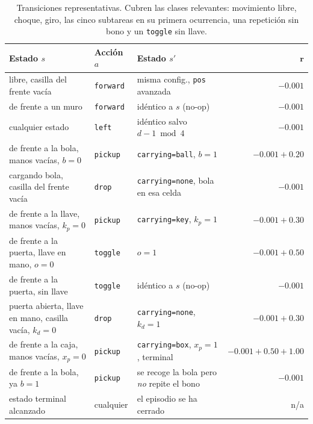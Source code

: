 \documentclass[11pt,a4paper]{article}
\begin{document}
\begin{table}[h]
  \centering
  \footnotesize
  \setlength{\extrarowheight}{3pt}
  \begin{tabularx}{\linewidth}{X l X r}
    \toprule
    \textbf{Estado \(s\)} & \textbf{Acción \(a\)} & \textbf{Estado \(s'\)} & \(\boldsymbol{r}\) \\
    \midrule
    libre, casilla del frente vacía & \texttt{forward} & misma config., \texttt{pos} avanzada & \(-0.001\) \\
    de frente a un muro & \texttt{forward} & idéntico a \(s\) (no-op) & \(-0.001\) \\
    cualquier estado & \texttt{left} & idéntico salvo \(d{-}1 \bmod 4\) & \(-0.001\) \\
    de frente a la bola, manos vacías, \(b{=}0\) & \texttt{pickup} & \texttt{carrying=ball}, \(b{=}1\) & \(-0.001 + 0.20\) \\
    cargando bola, casilla del frente vacía & \texttt{drop} & \texttt{carrying=none}, bola en esa celda & \(-0.001\) \\
    de frente a la llave, manos vacías, \(k_p{=}0\) & \texttt{pickup} & \texttt{carrying=key}, \(k_p{=}1\) & \(-0.001 + 0.30\) \\
    de frente a la puerta, llave en mano, \(o{=}0\) & \texttt{toggle} & \(o{=}1\) & \(-0.001 + 0.50\) \\
    de frente a la puerta, sin llave & \texttt{toggle} & idéntico a \(s\) (no-op) & \(-0.001\) \\
    puerta abierta, llave en mano, casilla vacía, \(k_d{=}0\) & \texttt{drop} & \texttt{carrying=none}, \(k_d{=}1\) & \(-0.001 + 0.30\) \\
    de frente a la caja, manos vacías, \(x_p{=}0\) & \texttt{pickup} & \texttt{carrying=box}, \(x_p{=}1\), terminal & \(-0.001 + 0.50 + 1.00\) \\
    de frente a la bola, ya \(b{=}1\) & \texttt{pickup} & se recoge la bola pero \emph{no} repite el bono & \(-0.001\) \\
    estado terminal alcanzado & cualquier & el episodio se ha cerrado & n/a \\
    \bottomrule
  \end{tabularx}
  \caption{Transiciones representativas. Cubren las clases relevantes:
  movimiento libre, choque, giro, las cinco subtareas en su primera
  ocurrencia, una repetición sin bono y un \texttt{toggle} sin llave.}
  \label{tab:transitions}
\end{table}

\end{document}
